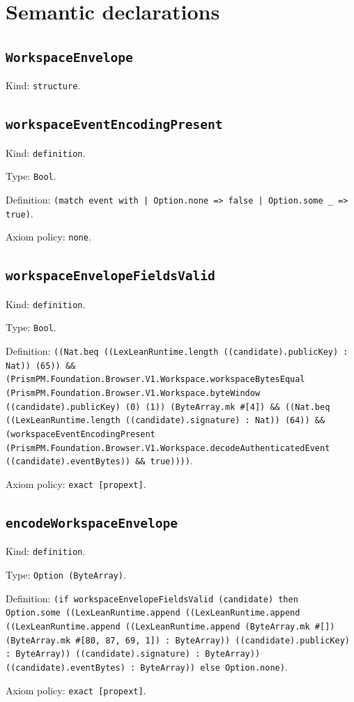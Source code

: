 \documentclass[11pt]{article}
\begin{document}
\section*{Semantic declarations}
\subsection*{\texttt{WorkspaceEnvelope}}
\noindent Kind: \texttt{structure}.\par
\subsection*{\texttt{workspaceEventEncodingPresent}}
\noindent Kind: \texttt{definition}.\par
\noindent Type: \texttt{Bool}.\par
\noindent Definition: \texttt{(match event with | Option.none => false | Option.some \_ => true)}.\par
\noindent Axiom policy: \texttt{none}.\par
\subsection*{\texttt{workspaceEnvelopeFieldsValid}}
\noindent Kind: \texttt{definition}.\par
\noindent Type: \texttt{Bool}.\par
\noindent Definition: \texttt{((Nat.beq ((LexLeanRuntime.length ((candidate).publicKey) : Nat)) (65)) \&\& (PrismPM.Foundation.Browser.V1.Workspace.workspaceBytesEqual (PrismPM.Foundation.Browser.V1.Workspace.byteWindow ((candidate).publicKey) (0) (1)) (ByteArray.mk \#[4]) \&\& ((Nat.beq ((LexLeanRuntime.length ((candidate).signature) : Nat)) (64)) \&\& (workspaceEventEncodingPresent (PrismPM.Foundation.Browser.V1.Workspace.decodeAuthenticatedEvent ((candidate).eventBytes)) \&\& true))))}.\par
\noindent Axiom policy: \texttt{exact [propext]}.\par
\subsection*{\texttt{encodeWorkspaceEnvelope}}
\noindent Kind: \texttt{definition}.\par
\noindent Type: \texttt{Option (ByteArray)}.\par
\noindent Definition: \texttt{(if workspaceEnvelopeFieldsValid (candidate) then Option.some ((LexLeanRuntime.append ((LexLeanRuntime.append ((LexLeanRuntime.append ((LexLeanRuntime.append (ByteArray.mk \#[]) (ByteArray.mk \#[80, 87, 69, 1]) : ByteArray)) ((candidate).publicKey) : ByteArray)) ((candidate).signature) : ByteArray)) ((candidate).eventBytes) : ByteArray)) else Option.none)}.\par
\noindent Axiom policy: \texttt{exact [propext]}.\par
\end{document}
